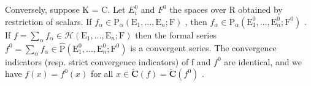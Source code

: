 Conversely, suppose K = C. Let \(E_{i}^{0}\) and \(F^{0}\) the spaces over R obtained by restriction of scalars. If \(f_{\alpha} \in \mathrm{P}_{\alpha}(\mathrm{E}_{1}, \ldots, \mathrm{E}_{n}; \mathrm{F})\) , then \(f_{\alpha} \in \mathrm{P}_{\alpha}(\mathrm{E}_{1}^{0}, \ldots, \mathrm{E}_{n}^{0}; \mathrm{F}^{0})\) . If \(f = \sum_{\alpha} f_{\alpha} \in \mathcal{H}(\mathrm{E}_{1}, \ldots, \mathrm{E}_{n}; \mathrm{F})\) then the formal series \(f^{0} = \sum_{\alpha} f_{\alpha} \in \hat{\mathrm{P}}(\mathrm{E}_{1}^{0}, \ldots, \mathrm{E}_{n}^{0}; \mathrm{F}^{0})\) is a convergent series. The convergence indicators (resp. strict convergence indicators) of f and \(f^{0}\) are identical, and we have \(f(x) = f^{0}(x)\) for all \(x \in \tilde{\mathbf{C}}(f) = \tilde{\mathbf{C}}(f^{0})\) .

